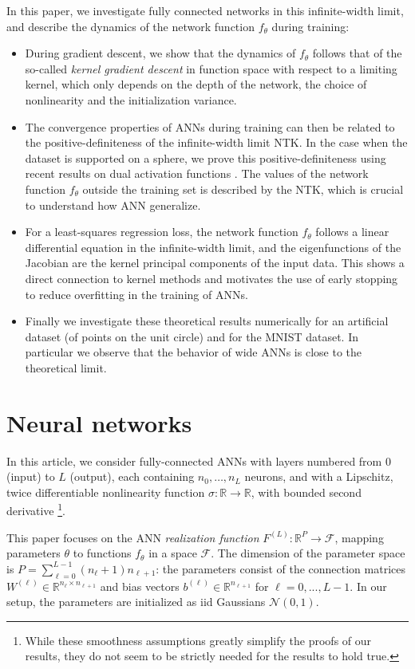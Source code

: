 In this paper, we investigate fully connected networks in this infinite-width limit, and describe the dynamics of the network function $f_\theta$ during training:

\begin{itemize}
\item During gradient descent, we show that the dynamics of $f_\theta$ follows that of the so-called \emph{kernel gradient descent} in function space with respect to a limiting kernel, which only depends on the depth of the network, the choice of nonlinearity and the initialization variance.
\item
The convergence properties of ANNs during training can then be related to the positive-definiteness of the infinite-width limit NTK. In the case when the dataset is supported on a sphere, we prove this positive-definiteness using recent results on dual activation functions \cite{Daniely}. The values of the network function $f_\theta$ outside the training set is described by the NTK, which is crucial to understand how ANN generalize.
\item
For a least-squares regression loss, the network function $f_{\theta}$ follows a linear differential equation in the infinite-width limit, and the eigenfunctions of the Jacobian are the kernel principal components of the input data. This shows a direct connection to kernel methods and motivates the use of early stopping to reduce overfitting in the training of ANNs.
\item
Finally we investigate these theoretical results numerically for an artificial dataset (of points on the unit circle) and for the MNIST dataset. In particular we observe that the behavior of wide ANNs is close to the theoretical limit.
\end{itemize}

\section{Neural networks}\label{sec:realization_function}
In this article, we consider fully-connected ANNs with layers numbered from $0$ (input) to $L$ (output), each containing $n_{0},\ldots,n_{L}$ neurons, and with a Lipschitz, twice differentiable nonlinearity function $\sigma:\mathbb{R}\to\mathbb{R}$, with bounded second derivative \footnote{While these smoothness assumptions greatly simplify the proofs of our results, they do not seem to be strictly needed for the results to hold true.}.

This paper focuses on the ANN \emph{realization function} $F^{(L)} : \mathbb{R}^{P} \to \mathcal{F}$, mapping parameters $\theta$ to functions $f_\theta$ in a space $\mathcal{F}$. The dimension of the parameter space is $P = \sum_{\ell=0}^{L-1} (n_\ell + 1) n_{\ell+1}$: the parameters consist of the connection matrices $W^{(\ell)} \in \mathbb{R}^{n_\ell \times n_{\ell+1}}$ and bias vectors $b^{(\ell)} \in \mathbb{R}^{n_{\ell+1}}$ for $\ell=0, ..., L-1$.  In our setup, the parameters are initialized as iid Gaussians $\mathcal{N}(0, 1)$.

